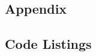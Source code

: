 \documentclass[11pt, a4paper]{article}
\begin{document}
\begin{appendices}
\section*{Appendix}
\subsection{Code Listings}




\end{appendices}


\begin{thebibliography}{1}


\end{thebibliography}
\end{document}
